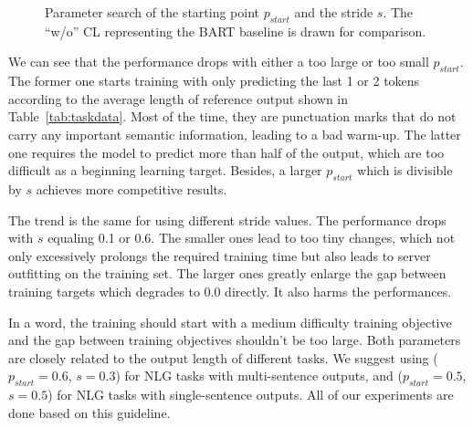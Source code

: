 \begin{figure}[th]
\begin{minipage}[t]{0.5\linewidth}
{			%
		}%
	\end{minipage}%
	\centering
	\caption{Parameter search of the starting point $p_{start}$ and the stride $s$. The ``w/o'' CL representing the BART baseline is drawn for comparison.} %
	\label{fig:stridestart}
\end{figure}


We can see that the performance drops with either a too large or too small $p_{start}$. The former one starts training with only predicting the last 1 or 2 tokens according to the average length of reference output shown in Table~\ref{tab:taskdata}. Most of the time, they are punctuation marks that do not carry any important semantic information, leading to a bad warm-up. The latter one requires the model to predict more than half of the output, which are too difficult as a beginning learning target. Besides, a larger $p_{start}$ which is divisible by $s$ achieves more competitive results.

The trend is the same for using different stride values. The performance drops with $s$ equaling 0.1 or 0.6. 
The smaller ones lead to too tiny changes, which not only excessively prolongs the required training time but also leads to server outfitting on the training set. The larger ones greatly enlarge the gap between training targets which degrades to 0.0 directly. It also harms the performances.

In a word, the training should start with a medium difficulty training objective and the gap between training objectives shouldn't be too large. Both parameters are closely related to the output length of different tasks. We suggest using ($p_{start}=0.6$, $s=0.3$) for NLG tasks with multi-sentence outputs, and ($p_{start}=0.5$, $s=0.5$) for NLG tasks with single-sentence outputs. All of our experiments are done based on this guideline. %


